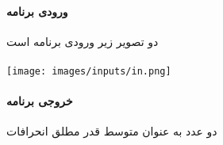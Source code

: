 \documentclass[12pt]{article}
\begin{document}
		\paragraph{ورودی برنامه}
		دو تصویر زیر ورودی برنامه است \\
		\vspace{0.5cm}\\
		\texttt{[image: images/inputs/in.png]}
		\paragraph{خروجی برنامه}
		دو عدد به عنوان متوسط قدر مطلق انحرافات\\
		\noindent
	\\
	
	\raggedleft
	
\end{document}
